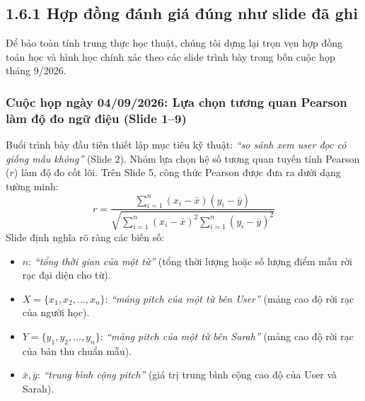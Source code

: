 \documentclass[11pt,a4paper]{article}
\begin{document}
\subsection*{1.6.1 Hợp đồng đánh giá đúng như slide đã ghi}

Để bảo toàn tính trung thực học thuật, chúng tôi dựng lại trọn vẹn hợp đồng toán học và hình học chính xác theo các slide trình bày trong bốn cuộc họp tháng 9/2026.

\subsubsection*{Cuộc họp ngày 04/09/2026: Lựa chọn tương quan Pearson làm độ đo ngữ điệu (Slide 1--9)}

Buổi trình bày đầu tiên thiết lập mục tiêu kỹ thuật: \textit{``so sánh xem user đọc có giống mẫu không''} (Slide 2). Nhóm lựa chọn hệ số tương quan tuyến tính Pearson ($r$) làm độ đo cốt lõi. Trên Slide 5, công thức Pearson được đưa ra dưới dạng tường minh:
\begin{equation}
r = \frac{\sum_{i=1}^n (x_i - \bar{x})(y_i - \bar{y})}{\sqrt{\sum_{i=1}^n (x_i - \bar{x})^2 \sum_{i=1}^n (y_i - \bar{y})^2}}
\label{eq:slide_pearson}
\end{equation}
Slide định nghĩa rõ ràng các biến số:
\begin{itemize}
    \item $n$: \textit{``tổng thời gian của một từ''} (tổng thời lượng hoặc số lượng điểm mẫu rời rạc đại diện cho từ).
    \item $X = \{x_1, x_2, \dots, x_n\}$: \textit{``mảng pitch của một từ bên User''} (mảng cao độ rời rạc của người học).
    \item $Y = \{y_1, y_2, \dots, y_n\}$: \textit{``mảng pitch của một từ bên Sarah''} (mảng cao độ rời rạc của bản thu chuẩn mẫu).
    \item $\bar{x}, \bar{y}$: \textit{``trung bình cộng pitch''} (giá trị trung bình cộng cao độ của User và Sarah).
\end{itemize}
\end{document}
